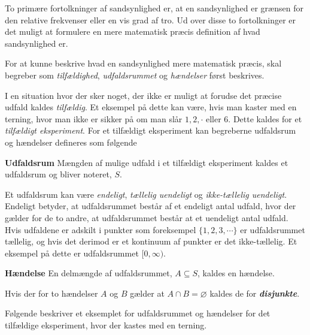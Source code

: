 To primære fortolkninger af sandsynlighed er, at en sandsynlighed er grænsen for den relative frekvenser eller en vis grad af tro. Ud over disse to fortolkninger er det muligt at formulere en mere matematisk præcis definition af hvad sandsynlighed er.

For at kunne beskrive hvad en sandsynlighed mere matematisk præcis, skal begreber som \textit{tilfældighed}, \textit{udfaldsrummet} og \textit{hændelser} først beskrives.

I en situation hvor der sker noget, der ikke er muligt at forudse det præcise udfald kaldes \textit{tilfældig}. Et eksempel på dette kan være, hvis man kaster med en terning, hvor man ikke er sikker på om man slår $1, 2, \cdot$ eller $6$. Dette kaldes for et \textit{tilfældigt eksperiment}. For et tilfældigt eksperiment kan begreberne udfaldsrum og hændelser defineres som følgende

\begin{minipage}\textwidth
\begin{defn}\textbf{Udfaldsrum} %
\newline
Mængden af mulige udfald i et tilfældigt eksperiment kaldes et udfaldsrum og bliver noteret, $S$.
\end{defn}
\end{minipage}

Et udfaldsrum kan være \textit{endeligt}, \textit{tællelig uendeligt} og \textit{ikke-tællelig uendeligt}. Endeligt betyder, at udfaldsrummet består af et endeligt antal udfald, hvor der gælder for de to andre, at udfaldsrummet består at et uendeligt antal udfald. Hvis udfaldene er adskilt i punkter som foreksempel $\{1,2,3, \cdots\}$ er udfaldsrummet tællelig, og hvis det derimod er et kontinuum af punkter er det ikke-tællelig. Et eksempel på dette er udfaldsrummet $[0, \infty)$.

\begin{minipage}\textwidth
\begin{defn}\textbf{Hændelse} %
\newline
En delmængde af udfaldsrummet, $A \subseteq S$, kaldes en hændelse.
\end{defn}
\end{minipage}

Hvis der for to hændelser $A$ og $B$ gælder at $A \cap B = \varnothing$ kaldes de for \textbf{\textit{disjunkte}}.

Følgende beskriver et eksemplet for udfaldsrummet og hændelser for det tilfældige eksperiment, hvor der kastes med en terning.

